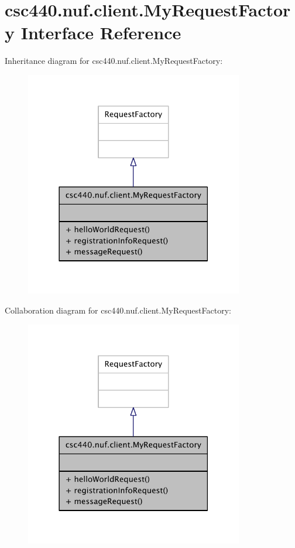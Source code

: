 \hypertarget{interfacecsc440_1_1nuf_1_1client_1_1_my_request_factory}{\section{csc440.\-nuf.\-client.\-My\-Request\-Factory Interface Reference}
\label{interfacecsc440_1_1nuf_1_1client_1_1_my_request_factory}
}


Inheritance diagram for csc440.\-nuf.\-client.\-My\-Request\-Factory\-:
\nopagebreak
\begin{figure}[H]
\begin{center}
\leavevmode
\includegraphics[width=270pt]{interfacecsc440_1_1nuf_1_1client_1_1_my_request_factory__inherit__graph}
\end{center}
\end{figure}


Collaboration diagram for csc440.\-nuf.\-client.\-My\-Request\-Factory\-:
\nopagebreak
\begin{figure}[H]
\begin{center}
\leavevmode
\includegraphics[width=270pt]{interfacecsc440_1_1nuf_1_1client_1_1_my_request_factory__coll__graph}
\end{center}
\end{figure}
